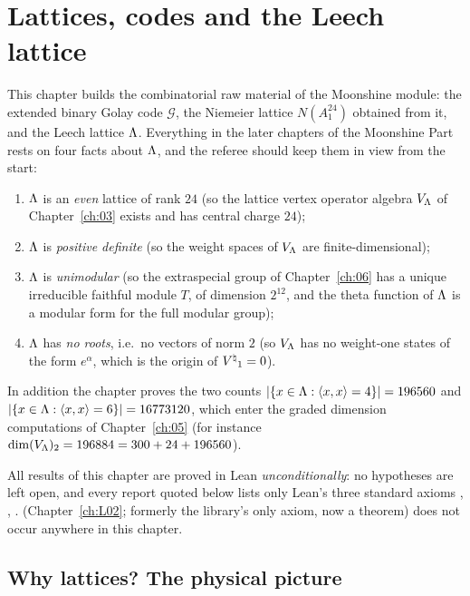 \chapter{Lattices, codes and the Leech lattice}\label{ch:02}

\providecommand{\chtwoG}{\mathcal{G}}
\providecommand{\chtwoF}{\mathbb{F}_2}
\providecommand{\chtwowt}{\operatorname{wt}}
\providecommand{\chtworank}{\operatorname{rank}}

This chapter builds the combinatorial raw material of the Moonshine module: the extended binary
Golay code $\chtwoG$, the Niemeier lattice $N(A_1^{24})$ obtained from it, and the Leech lattice
${\Lambda}$.  Everything in the later chapters of the Moonshine Part rests on four facts about
${\Lambda}$, and the referee should keep them in view from the start:
\begin{enumerate}[label=($\Lambda$\arabic*)]
  \item ${\Lambda}$ is an \emph{even} lattice of rank $24$ (so the lattice vertex operator algebra
        $V_{\Lambda}$ of Chapter~\ref{ch:03} exists and has central charge $24$);
  \item ${\Lambda}$ is \emph{positive definite} (so the weight spaces of $V_{\Lambda}$ are
        finite-dimensional);
  \item ${\Lambda}$ is \emph{unimodular} (so the extraspecial group of Chapter~\ref{ch:06} has a
        unique irreducible faithful module $T$, of dimension $2^{12}$, and the theta function of
        ${\Lambda}$ is a modular form for the full modular group);
  \item ${\Lambda}$ has \emph{no roots}, i.e.\ no vectors of norm $2$ (so $V_{\Lambda}$ has no
        weight-one states of the form $e^\alpha$, which is the origin of ${V^{\natural}}_1=0$).
\end{enumerate}
In addition the chapter proves the two counts $|\{x\in{\Lambda}:\langle x,x\rangle=4\}|=196560$ and
$|\{x\in{\Lambda}:\langle x,x\rangle=6\}|=16773120$, which enter the graded dimension computations
of Chapter~\ref{ch:05} (for instance $\dim (V_{\Lambda})_2 = 196884 = 300+24+196560$).

All results of this chapter are proved in Lean \emph{unconditionally}: no hypotheses are left
open, and every  report quoted below lists only Lean's three standard axioms
, , .  
(Chapter~\ref{ch:L02}; formerly the library's only axiom, now a theorem) does not occur anywhere
in this chapter.

\section{Why lattices? The physical picture}\label{ch02:sec:physics}

